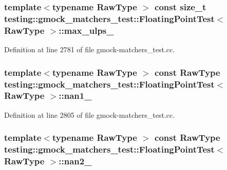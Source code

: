 \subsubsection[{\texorpdfstring{max\+\_\+ulps\+\_\+}{max_ulps_}}]{\setlength{\rightskip}{0pt plus 5cm}template$<$typename Raw\+Type $>$ const size\+\_\+t {\bf testing\+::gmock\+\_\+matchers\+\_\+test\+::\+Floating\+Point\+Test}$<$ Raw\+Type $>$\+::max\+\_\+ulps\+\_\+\hspace{0.3cm}{\ttfamily [protected]}}\hypertarget{classtesting_1_1gmock__matchers__test_1_1_floating_point_test_a253abb77b6555a98a100c253224bb860}{}\label{classtesting_1_1gmock__matchers__test_1_1_floating_point_test_a253abb77b6555a98a100c253224bb860}


Definition at line 2781 of file gmock-\/matchers\+\_\+test.\+cc.

\subsubsection[{\texorpdfstring{nan1\+\_\+}{nan1_}}]{\setlength{\rightskip}{0pt plus 5cm}template$<$typename Raw\+Type $>$ const Raw\+Type {\bf testing\+::gmock\+\_\+matchers\+\_\+test\+::\+Floating\+Point\+Test}$<$ Raw\+Type $>$\+::nan1\+\_\+\hspace{0.3cm}{\ttfamily [protected]}}\hypertarget{classtesting_1_1gmock__matchers__test_1_1_floating_point_test_a0d2544956414eac21d4519fe600e4603}{}\label{classtesting_1_1gmock__matchers__test_1_1_floating_point_test_a0d2544956414eac21d4519fe600e4603}


Definition at line 2805 of file gmock-\/matchers\+\_\+test.\+cc.

\subsubsection[{\texorpdfstring{nan2\+\_\+}{nan2_}}]{\setlength{\rightskip}{0pt plus 5cm}template$<$typename Raw\+Type $>$ const Raw\+Type {\bf testing\+::gmock\+\_\+matchers\+\_\+test\+::\+Floating\+Point\+Test}$<$ Raw\+Type $>$\+::nan2\+\_\+\hspace{0.3cm}{\ttfamily [protected]}}\hypertarget{classtesting_1_1gmock__matchers__test_1_1_floating_point_test_a4af3b3e53a06d271479ff30f5d5ee155}{}\label{classtesting_1_1gmock__matchers__test_1_1_floating_point_test_a4af3b3e53a06d271479ff30f5d5ee155}


